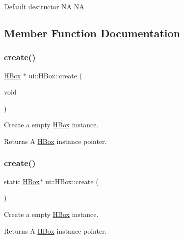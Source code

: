Default destructor  NA  NA 

\subsection{Member Function Documentation}
\mbox{\label{classui_1_1HBox_ac58f3438c4fd27ce7fe76079231473bf}} 
\subsubsection{\texorpdfstring{create()}{create()}\hspace{0.1cm}{\footnotesize\ttfamily [1/4]}}
{\footnotesize\ttfamily \hyperlink{classui_1_1HBox}{H\+Box} $\ast$ ui\+::\+H\+Box\+::create (\begin{DoxyParamCaption}\item[{void}]{ }\end{DoxyParamCaption})\hspace{0.3cm}{\ttfamily [static]}}

Create a empty \hyperlink{classui_1_1HBox}{H\+Box} instance. \begin{DoxyReturn}{Returns}
A \hyperlink{classui_1_1HBox}{H\+Box} instance pointer. 
\end{DoxyReturn}
\mbox{\label{classui_1_1HBox_abadedafe56d3fa3a59032c373e6e4204}} 
\subsubsection{\texorpdfstring{create()}{create()}\hspace{0.1cm}{\footnotesize\ttfamily [2/4]}}
{\footnotesize\ttfamily static \hyperlink{classui_1_1HBox}{H\+Box}$\ast$ ui\+::\+H\+Box\+::create (\begin{DoxyParamCaption}{ }\end{DoxyParamCaption})\hspace{0.3cm}{\ttfamily [static]}}

Create a empty \hyperlink{classui_1_1HBox}{H\+Box} instance. \begin{DoxyReturn}{Returns}
A \hyperlink{classui_1_1HBox}{H\+Box} instance pointer. 
\end{DoxyReturn}
\mbox{\label{classui_1_1HBox_a044268defeca5792a7a9a37d751ea2a7}} 
